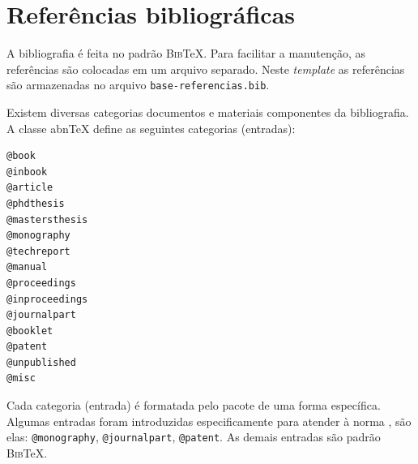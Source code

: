 \section{Referências bibliográficas}
\label{sec:referenciasBibliograficas}

A bibliografia é feita no padrão \textsc{Bib}\TeX{}. Para facilitar a manutenção, as referências são colocadas em um arquivo separado. Neste \textit{template} as referências são armazenadas no arquivo \verb|base-referencias.bib|.

Existem diversas categorias documentos e materiais componentes da bibliografia. A classe abn\TeX{} define as seguintes categorias (entradas):

\begin{verbatim}
@book
@inbook
@article
@phdthesis
@mastersthesis
@monography
@techreport
@manual
@proceedings
@inproceedings
@journalpart
@booklet
@patent
@unpublished
@misc
\end{verbatim}

Cada categoria (entrada) é formatada pelo pacote  de uma forma específica. Algumas entradas foram introduzidas especificamente para atender à norma , são elas: \verb|@monography|, \verb|@journalpart|, \verb|@patent|. As demais entradas são padrão \textsc{Bib}\TeX{}.
